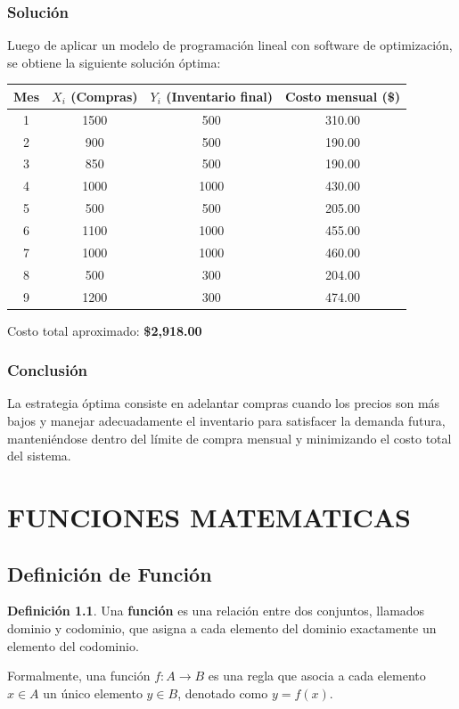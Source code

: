 \documentclass[12pt, a4paper, oneside]{book}
\theoremstyle{definition}
\newtheorem{definicion}{Definición}[chapter]
\begin{document}
\subsection{Solución}

Luego de aplicar un modelo de programación lineal con software de optimización, se obtiene la siguiente solución óptima:

\begin{center}
\begin{tabular}{cccc}
\toprule
Mes & \(X_i\) (Compras) & \(Y_i\) (Inventario final) & Costo mensual (\$) \\
\midrule
1 & 1500 & 500 & 310.00 \\
2 & 900  & 500 & 190.00 \\
3 & 850  & 500 & 190.00 \\
4 & 1000 & 1000 & 430.00 \\
5 & 500  & 500 & 205.00 \\
6 & 1100 & 1000 & 455.00 \\
7 & 1000 & 1000 & 460.00 \\
8 & 500  & 300 & 204.00 \\
9 & 1200 & 300 & 474.00 \\
\bottomrule
\end{tabular}
\end{center}

Costo total aproximado: \textbf{\$2,918.00}

\subsection{Conclusión}
La estrategia óptima consiste en adelantar compras cuando los precios son más bajos y manejar adecuadamente el inventario para satisfacer la demanda futura, manteniéndose dentro del límite de compra mensual y minimizando el costo total del sistema.

\chapter{FUNCIONES MATEMATICAS}

\section{Definición de Función}

\begin{definicion}
Una \textbf{función} es una relación entre dos conjuntos, llamados dominio y codominio, que asigna a cada elemento del dominio exactamente un elemento del codominio.

Formalmente, una función $f: A \rightarrow B$ es una regla que asocia a cada elemento $x \in A$ un único elemento $y \in B$, denotado como $y = f(x)$.
\end{definicion}
\end{document}
